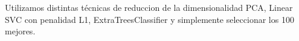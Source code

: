 Utilizamos distintas técnicas de reduccion de la dimensionalidad PCA, Linear SVC con penalidad L1, ExtraTreesClassifier y simplemente seleccionar los 100 mejores.

